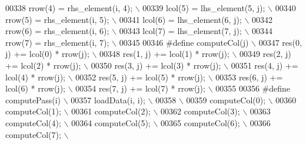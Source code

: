 \begin{DoxyCode}
00338 \textcolor{preprocessor}{    rrow(4) = rhs\_element(i, 4);               \(\backslash\)}
00339 \textcolor{preprocessor}{    lcol(5) = lhs\_element(5, j);               \(\backslash\)}
00340 \textcolor{preprocessor}{    rrow(5) = rhs\_element(i, 5);               \(\backslash\)}
00341 \textcolor{preprocessor}{    lcol(6) = lhs\_element(6, j);               \(\backslash\)}
00342 \textcolor{preprocessor}{    rrow(6) = rhs\_element(i, 6);               \(\backslash\)}
00343 \textcolor{preprocessor}{    lcol(7) = lhs\_element(7, j);               \(\backslash\)}
00344 \textcolor{preprocessor}{    rrow(7) = rhs\_element(i, 7);               \(\backslash\)}
00345 \textcolor{preprocessor}{}
00346 \textcolor{preprocessor}{#define computeCol(j)                           \(\backslash\)}
00347 \textcolor{preprocessor}{    res(0, j) += lcol(0) * rrow(j);             \(\backslash\)}
00348 \textcolor{preprocessor}{    res(1, j) += lcol(1) * rrow(j);             \(\backslash\)}
00349 \textcolor{preprocessor}{    res(2, j) += lcol(2) * rrow(j);             \(\backslash\)}
00350 \textcolor{preprocessor}{    res(3, j) += lcol(3) * rrow(j);             \(\backslash\)}
00351 \textcolor{preprocessor}{    res(4, j) += lcol(4) * rrow(j);             \(\backslash\)}
00352 \textcolor{preprocessor}{    res(5, j) += lcol(5) * rrow(j);             \(\backslash\)}
00353 \textcolor{preprocessor}{    res(6, j) += lcol(6) * rrow(j);             \(\backslash\)}
00354 \textcolor{preprocessor}{    res(7, j) += lcol(7) * rrow(j);             \(\backslash\)}
00355 \textcolor{preprocessor}{}
00356 \textcolor{preprocessor}{#define computePass(i)                          \(\backslash\)}
00357 \textcolor{preprocessor}{    loadData(i, i);                             \(\backslash\)}
00358 \textcolor{preprocessor}{                                                \(\backslash\)}
00359 \textcolor{preprocessor}{    computeCol(0);                              \(\backslash\)}
00360 \textcolor{preprocessor}{    computeCol(1);                              \(\backslash\)}
00361 \textcolor{preprocessor}{    computeCol(2);                              \(\backslash\)}
00362 \textcolor{preprocessor}{    computeCol(3);                              \(\backslash\)}
00363 \textcolor{preprocessor}{    computeCol(4);                              \(\backslash\)}
00364 \textcolor{preprocessor}{    computeCol(5);                              \(\backslash\)}
00365 \textcolor{preprocessor}{    computeCol(6);                              \(\backslash\)}
00366 \textcolor{preprocessor}{    computeCol(7);                              \(\backslash\)}

\end{DoxyCode}
